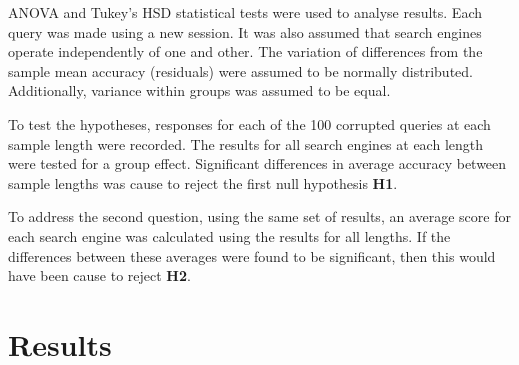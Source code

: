 \documentclass{csfourzero}
\begin{document}
ANOVA and Tukey's HSD statistical tests were used to analyse results. Each query was made using a new session. It was also assumed that search engines operate independently of one and other. The variation of differences from the sample mean accuracy (residuals) were assumed to be normally distributed. Additionally, variance within groups was assumed to be equal.

To test the hypotheses, responses for each of the 100 corrupted queries at each sample length were recorded. The results for all search engines at each length were tested for a group effect. Significant differences in average accuracy between sample lengths was cause to reject the first null hypothesis \textbf{H1}.

To address the second question, using the same set of results, an average score for each search engine was calculated using the results for all lengths. If the differences between these averages were found to be significant, then this would have been cause to reject \textbf{H2}.

\section{Results}
\label{sec:results}
\end{document}
